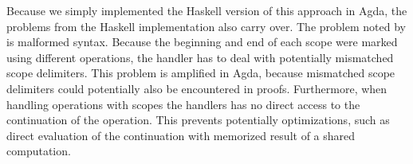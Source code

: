 Because we simply implemented the Haskell version of this approach in Agda, the
problems from the Haskell implementation also carry over.
The problem noted by \textcite{DBLP:conf/haskell/WuSH14} is malformed syntax.
Because the beginning and end of each scope were marked using different
operations, the handler has to deal with potentially mismatched scope delimiters.
This problem is amplified in Agda, because mismatched scope delimiters could
potentially also be encountered in proofs.
Furthermore, when handling operations with scopes the handlers has no direct
access to the continuation of the operation.
This prevents potentially optimizations, such as direct evaluation of the
continuation with memorized result of a shared computation.

